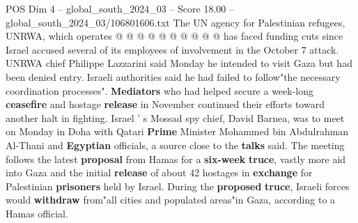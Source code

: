 \begin{textsample}{POS Dim 4 – global\_south\_2024\_03 – Score 18.00 – global\_south\_2024\_03/106801606.txt}
The UN agency for Palestinian refugees, UNRWA, which operates @ @ @ @ @ @ @ @ @ @ has faced funding cuts since Israel accused several of its employees of involvement in the October 7 attack.
UNRWA chief Philippe Lazzarini said Monday he intended to visit Gaza but had been denied entry.
Israeli authorities said he had failed to follow"the necessary coordination processes". \textbf{Mediators} who had helped secure a week-long \textbf{ceasefire} and hostage \textbf{release} in November continued their efforts toward another halt in fighting.
Israel ' s Mossad spy chief, David Barnea, was to meet on Monday in Doha with Qatari \textbf{Prime} Minister Mohammed bin Abdulrahman Al-Thani and \textbf{Egyptian} officials, a source close to the \textbf{talks} said.
The meeting follows the latest \textbf{proposal} from Hamas for a \textbf{six-week} \textbf{truce}, vastly more aid into Gaza and the initial \textbf{release} of about 42 hostages in \textbf{exchange} for Palestinian \textbf{prisoners} held by Israel.
During the \textbf{proposed} \textbf{truce}, Israeli forces would \textbf{withdraw} from"all cities and populated areas"in Gaza, according to a Hamas official.

\end{textsample}
